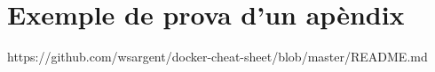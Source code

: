 \chapter{Exemple de prova d'un apèndix}

https://github.com/wsargent/docker-cheat-sheet/blob/master/README.md